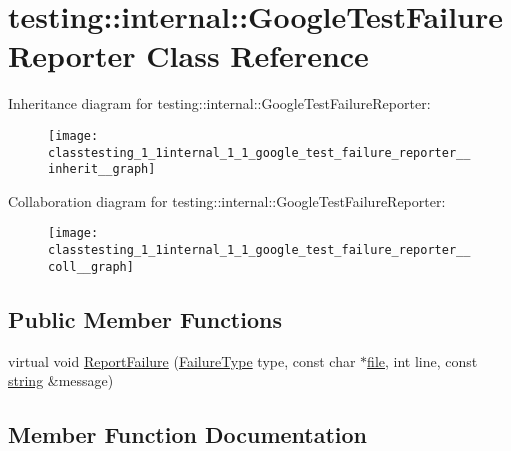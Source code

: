 \hypertarget{classtesting_1_1internal_1_1_google_test_failure_reporter}{}\section{testing\+:\+:internal\+:\+:Google\+Test\+Failure\+Reporter Class Reference}
\label{classtesting_1_1internal_1_1_google_test_failure_reporter}


Inheritance diagram for testing\+:\+:internal\+:\+:Google\+Test\+Failure\+Reporter\+:
\nopagebreak
\begin{figure}[H]
\begin{center}
\leavevmode
\texttt{[image: classtesting\_1\_1internal\_1\_1\_google\_test\_failure\_reporter\_\_inherit\_\_graph]}
\end{center}
\end{figure}


Collaboration diagram for testing\+:\+:internal\+:\+:Google\+Test\+Failure\+Reporter\+:
\nopagebreak
\begin{figure}[H]
\begin{center}
\leavevmode
\texttt{[image: classtesting\_1\_1internal\_1\_1\_google\_test\_failure\_reporter\_\_coll\_\_graph]}
\end{center}
\end{figure}
\subsection*{Public Member Functions}
\begin{DoxyCompactItemize}
\item 
virtual void \hyperlink{classtesting_1_1internal_1_1_google_test_failure_reporter_a9b2f81e6c5b6e9f618fd75cc3e27e94c}{Report\+Failure} (\hyperlink{gtest__environment__test_8cc_aa43ad7e2c1c5c5150ba8d95607a96263}{Failure\+Type} type, const char $\ast$\hyperlink{_07copy_08_2_read_camera_model_8m_a151631b2fd2bb776ef06c9f440a7ed74}{file}, int line, const \hyperlink{namespacetesting_1_1internal_a8e8ff5b11e64078831112677156cb111}{string} \&message)
\end{DoxyCompactItemize}


\subsection{Member Function Documentation}
